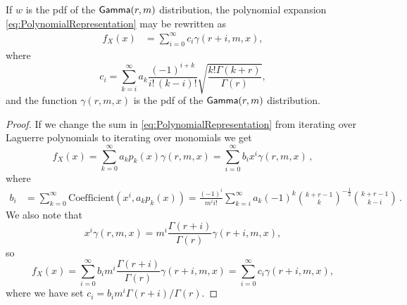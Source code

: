 \begin{lemma}\label{Lemma:PseudoMixtureOfGammas}
If $w$ is the pdf of the $\mathsf{Gamma}(r,m)$ distribution, the polynomial expansion \eqref{eq:PolynomialRepresentation}  may be rewritten as
\begin{align}\label{eq:PseudoMixtureOfGammas}
f_{X}(x)&= \sum_{i=0}^{\infty} c_i \gamma(r+i,m,x), %
\end{align}
where
\begin{equation}\label{eq:PiExpression}
c_i
=\sum_{k=i}^\infty a_k \frac{(-1)^{i+k}}{i! \, (k-i)!} \sqrt{\frac{k! \Gamma(k+r)}{\Gamma(r)}},
\end{equation}
and the function $\gamma(r,m,x)$ is the pdf of the $\mathsf{Gamma}(r,m)$ distribution.

\end{lemma}
\begin{proof}
If we change the sum in \eqref{eq:PolynomialRepresentation} from iterating over Laguerre polynomials to iterating over monomials we get
\[
f_{X}(x)=\sum_{k=0}^{\infty} a_k p_{k}(x) \gamma(r,m,x) = \sum_{i=0}^\infty b_i x^i \gamma(r,m,x) \, ,
\]
where
\begin{align*}
b_i
&= \sum_{k=0}^\infty \text{Coefficient}(x^i, a_k  p_k(x)) %
= \frac{(-1)^i}{m^i i!} \sum_{k=i}^\infty a_k (-1)^{k} \binom{k + r - 1}{k}^{-\frac12} \binom{k + r - 1}{k - i} \,.
\end{align*}
We also note that
\[ x^i \gamma(r, m, x) = m^i \frac{\Gamma(r+i)}{\Gamma(r)} \gamma(r+i, m, x), \]
so
\[ f_{X}(x) = \sum_{i=0}^\infty b_i m^i \frac{\Gamma(r+i)}{\Gamma(r)} \gamma(r+i, m, x) =  \sum_{i=0}^\infty c_i \gamma(r+i, m, x),  \]
where we have set $c_i = b_i m^i \Gamma(r+i) / \Gamma(r)$.
\end{proof}

